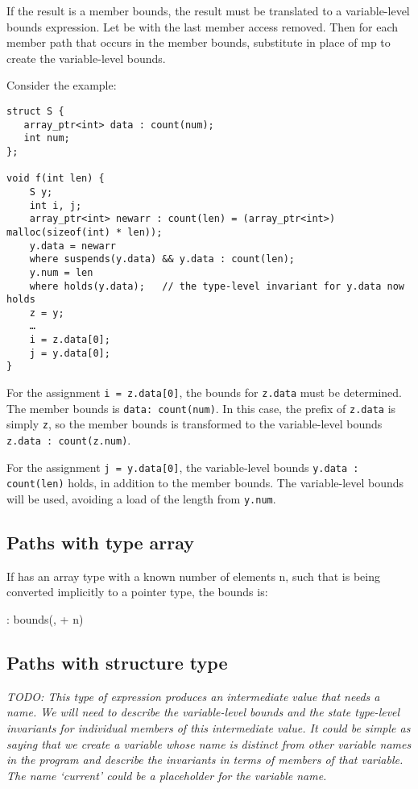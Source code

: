 If the result is a member bounds, the result must be translated to a
variable-level bounds expression. Let  be  with the
last member access removed. Then for each member path  that
occurs in the member bounds, substitute  in place of mp
to create the variable-level bounds.

Consider the example:
\begin{verbatim}
struct S {
   array_ptr<int> data : count(num);
   int num;
};

void f(int len) {
    S y;
    int i, j;
    array_ptr<int> newarr : count(len) = (array_ptr<int>) malloc(sizeof(int) * len));
    y.data = newarr
    where suspends(y.data) && y.data : count(len);
    y.num = len
    where holds(y.data);   // the type-level invariant for y.data now holds
    z = y;
    …
    i = z.data[0];
    j = y.data[0];
}
\end{verbatim}

For the assignment \texttt{i = z.data[0]}, the bounds for
\texttt{z.data} must be determined. The member bounds is \texttt{data:
count(num)}. In this case, the prefix of \texttt{z.data} is simply
\texttt{z}, so the member bounds is transformed to the variable-level
bounds \texttt{z.data : count(z.num)}.

For the assignment \texttt{j = y.data[0]}, the variable-level bounds
\texttt{y.data : count(len)} holds, in addition to the member bounds.
The variable-level bounds will be used, avoiding a load of the length
from \texttt{y.num}.

\subsection{Paths with type array}\label{paths-with-type-array}

If  has an array type with a known number of elements n,
such that  is being converted implicitly to a pointer type,
the bounds is:

 : bounds(,  + n)

\subsection{Paths with structure type}\label{paths-with-structure-type}

\emph{TODO: This type of expression produces an intermediate value that
needs a name. We will need to describe the variable-level bounds and the
state type-level invariants for individual members of this intermediate
value. It could be simple as saying that we create a variable whose name
is distinct from other variable names in the program and describe the
invariants in terms of members of that variable. The name `current'
could be a placeholder for the variable name.}

